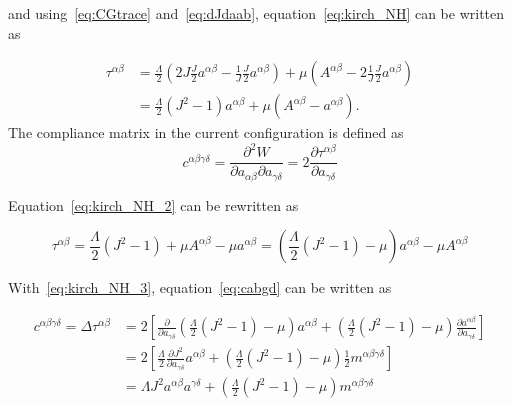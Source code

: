 \begin{itemize}
and using~\eqref{eq:CGtrace} and~\eqref{eq:dJdaab}, equation~\eqref{eq:kirch_NH} can be written as

\begin{equation}\label{eq:kirch_NH_2}
    \begin{split}
        \tau^{\alpha \beta} &= \frac{\Lambda}{2} \left( 2 J \frac{J}{2} a^{\alpha \beta} - \frac{1}{J} \frac{J}{2} a^{\alpha \beta} \right) + \mu \left( A^{\alpha \beta} - 2 \frac{1}{J} \frac{J}{2} a^{\alpha \beta} \right) \\ &= \frac{\Lambda}{2} \left( J^{2} - 1 \right) a^{\alpha \beta} + \mu \left( A^{\alpha \beta} - a^{\alpha \beta} \right).
    \end{split}
\end{equation}
The compliance matrix in the current configuration is defined as
\begin{equation}\label{eq:cabgd}
    c^{\alpha \beta \gamma \delta} = \frac{\partial^{2} W}{\partial a_{\alpha \beta} \partial a_{\gamma \delta}} = 2 \frac{\partial \tau^{\alpha \beta}}{\partial a_{\gamma \delta}}
\end{equation}

Equation~\eqref{eq:kirch_NH_2} can be rewritten as

\begin{equation}\label{eq:kirch_NH_3}
    \tau^{\alpha \beta} = \frac{\Lambda}{2} \left( J^{2} - 1 \right) + \mu A^{\alpha \beta} - \mu a^{\alpha \beta} = \left( \frac{\Lambda}{2} \left( J^{2} - 1 \right) - \mu \right) a^{\alpha \beta} - \mu A^{\alpha \beta} 
\end{equation}

With~\eqref{eq:kirch_NH_3}, equation~\eqref{eq:cabgd} can be written as

\begin{equation}\label{eq:cabgd_2}
    \begin{split}
        c^{\alpha \beta \gamma \delta} = \Delta \tau^{\alpha \beta} &= 2 \left[ \frac{\partial }{\partial a_{\gamma \delta}} \left( \frac{\Lambda}{2} \left( J^{2} - 1 \right) - \mu \right) a^{\alpha \beta} + \left( \frac{\Lambda}{2} \left( J^{2} - 1 \right) - \mu \right) \frac{\partial a^{\alpha \beta}}{\partial a_{\gamma \delta}} \right] \\ &= 2 \left[ \frac{\Lambda}{2} \frac{\partial J^{2}}{\partial a_{\gamma \delta}} a^{\alpha \beta} + \left( \frac{\Lambda}{2} \left( J^{2} - 1 \right) - \mu \right) \frac{1}{2} m^{\alpha \beta \gamma \delta} \right] \\ &= \Lambda J^{2} a^{\alpha \beta} a^{\gamma \delta} + \left( \frac{\Lambda}{2} \left( J^{2} - 1 \right) - \mu \right) m^{\alpha \beta \gamma \delta}
    \end{split}
\end{equation}



\end{itemize}
